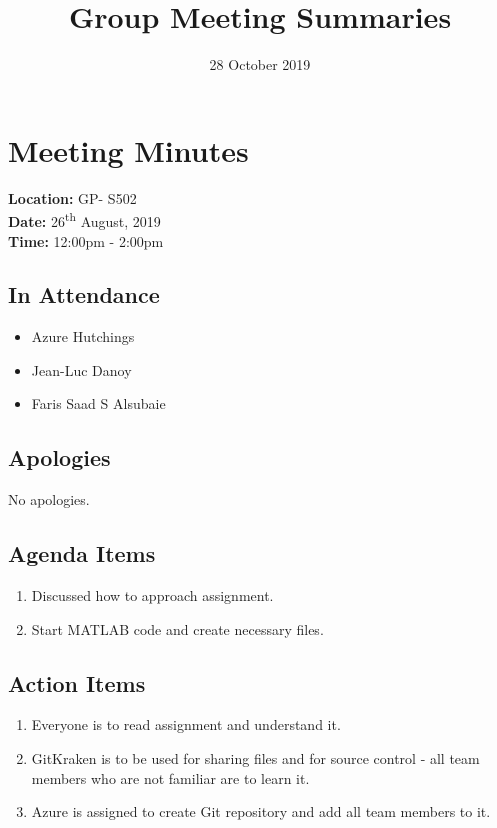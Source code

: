 \documentclass{article}
\title{Group Meeting Summaries}
\date{28 October 2019}
\begin{document}
\begin{titlepage}
\maketitle
\end{titlepage}

\section{Meeting Minutes}
\textbf{Location:} GP- S502 \\
\textbf{Date:} 26\textsuperscript{th} August, 2019 \\
\textbf{Time:} 12:00pm - 2:00pm

\subsection*{In Attendance}
\begin{itemize}
\item Azure Hutchings
\item Jean-Luc Danoy
\item Faris Saad S Alsubaie
\end{itemize}

\subsection*{Apologies}
No apologies. 

\subsection*{Agenda Items}
\begin{enumerate}
\item Discussed how to approach assignment.
\item Start MATLAB code and create necessary files.
\end{enumerate}

\subsection*{Action Items}
\begin{enumerate}
\item Everyone is to read assignment and understand it.
\item GitKraken is to be used for sharing files and for source control - all team members who are not familiar are to learn it.
\item Azure is assigned to create Git repository and add all team members to it.
\end{enumerate}
\end{document}
